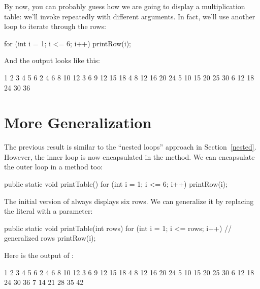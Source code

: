 %

By now, you can probably guess how we are going to display a multiplication table: we'll invoke  repeatedly with different arguments.
In fact, we'll use another loop to iterate through the rows:

\begin{code}
for (int i = 1; i <= 6; i++) {
    printRow(i);
}
\end{code}

And the output looks like this:

\begin{stdout}
   1   2   3   4   5   6
   2   4   6   8  10  12
   3   6   9  12  15  18
   4   8  12  16  20  24
   5  10  15  20  25  30
   6  12  18  24  30  36
\end{stdout}



\section{More Generalization}

The previous result is similar to the ``nested loops'' approach in Section~\ref{nested}.
However, the inner loop is now encapsulated in the  method.
We can encapsulate the outer loop in a method too:

\begin{code}
public static void printTable() {
    for (int i = 1; i <= 6; i++) {
        printRow(i);
    }
}
\end{code}

The initial version of  always displays six rows.
We can generalize it by replacing the literal  with a parameter:

\begin{code}
public static void printTable(int rows) {
    for (int i = 1; i <= rows; i++) {     // generalized rows
        printRow(i);
    }
}
\end{code}

Here is the output of :

\begin{stdout}
   1   2   3   4   5   6
   2   4   6   8  10  12
   3   6   9  12  15  18
   4   8  12  16  20  24
   5  10  15  20  25  30
   6  12  18  24  30  36
   7  14  21  28  35  42
\end{stdout}

